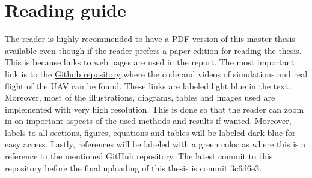 \documentclass[../Head/report.tex]{subfiles}
\begin{document}
\thispagestyle{empty}
\section*{Reading guide}

The reader is highly recommended to have a PDF version of this master thesis available even though if the reader prefers a paper edition for reading the thesis. This is because links to web pages are used in the report. The most important link is to the \href{https://github.com/Kenil16/master\_project}{Github repository} where the code and videos of simulations and real flight of the UAV can be found. These links are labeled light blue in the text. Moreover, most of the illustrations, diagrams, tables and images used are implemented with very high resolution. This is done so that the reader can zoom in on important aspects of the used methods and results if wanted. Moreover, labels to all sections, figures, equations and tables will be labeled dark blue for easy access. Lastly, references will be labeled with a green color as \cite{masterThesis} where this is a reference to the mentioned GitHub repository. The latest commit to this repository before the final uploading of this thesis is commit 3c6d6e3. 
\end{document}
